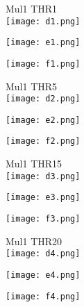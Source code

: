 \documentclass[a4paper]{article}
\begin{document}
    \begin{figure}[tb]
    Mul1 THR1 \\
    \texttt{[image: d1.png]}
        \begin{minipage}{0.48\textwidth}
            \def\svgwidth{\columnwidth}
            \texttt{[image: e1.png]}
        \end{minipage}
        \hspace{4em}
        \begin{minipage}{0.48\textwidth}
            \def\svgwidth{\columnwidth}
            \texttt{[image: f1.png]}
        \end{minipage}
    \end{figure}
    \newpage
    \begin{figure}[tb]
    Mul1 THR5 \\
    \texttt{[image: d2.png]}
        \begin{minipage}{0.48\textwidth}
            \def\svgwidth{\columnwidth}
            \texttt{[image: e2.png]}
        \end{minipage}
        \hspace{4em}
        \begin{minipage}{0.48\textwidth}
            \def\svgwidth{\columnwidth}
            \texttt{[image: f2.png]}
        \end{minipage}
    \end{figure}
    \newpage
    
    \begin{figure}[tb]
        Mul1 THR15 \\
    \texttt{[image: d3.png]}
        \begin{minipage}{0.48\textwidth}
            \def\svgwidth{\columnwidth}
            \texttt{[image: e3.png]}
        \end{minipage}
        \hspace{4em}
        \begin{minipage}{0.48\textwidth}
            \def\svgwidth{\columnwidth}
            \texttt{[image: f3.png]}
        \end{minipage}
    \end{figure}
    \newpage
    \begin{figure}[tb]
    Mul1 THR20 \\
    \texttt{[image: d4.png]}
        \begin{minipage}{0.48\textwidth}
            \def\svgwidth{\columnwidth}
            \texttt{[image: e4.png]}
        \end{minipage}
        \hspace{4em}
        \begin{minipage}{0.48\textwidth}
            \def\svgwidth{\columnwidth}
            \texttt{[image: f4.png]}
        \end{minipage}
    \end{figure}
    \newpage
    
\end{document}
